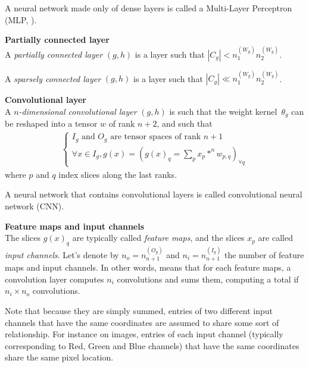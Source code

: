 A neural network made only of dense layers is called a Multi-Layer Perceptron (MLP, \cite{hornik1989multilayer}).

\begin{definition}\textbf{Partially connected layer}\\{}
A \emph{partially connected layer} $(g,h)$ is a layer such that $|C_g| < n_1^{(W_g)} n_2^{(W_g)}$.

A \emph{sparsely connected layer} $(g,h)$ is a layer such that $|C_g| \ll n_1^{(W_g)} n_2^{(W_g)}$.
\end{definition}

\begin{definition}\textbf{Convolutional layer}\\
A \emph{$n$-dimensional convolutional layer} $(g,h)$ is such that the weight kernel~$\theta_g$ can be reshaped into a tensor $w$ of rank $n+2$, and such that
\begin{gather*}
\left\{
\begin{array}{l}
  I_g \mbox{ and } O_g \mbox{ are tensor spaces of rank }n+1 \\
  \forall x \in I_g, g(x) = (g(x)_q = \sum\limits_p{x_p \ast^n w_{p,q}})_{\forall q}
\end{array}
\right.
\end{gather*}
where $p$ and $q$ index slices along the last ranks.
\label{def:convlayer}
\end{definition}

A neural network that contains convolutional layers is called convolutional neural network (CNN).

\begin{definition}\textbf{Feature maps and input channels}\\
The slices $g(x)_q$ are typically called \textit{feature maps}, and the slices $x_p$ are called \textit{input channels}. Let's denote by $n_o = n_{n+1}^{(O_g)}$ and $n_i =n_{n+1}^{(I_g)}$ the number of feature maps and input channels.
In other words,  means that for each feature maps, a convolution layer computes $n_i$ convolutions and sums them, computing a total if $n_i \times n_o$ convolutions.
\end{definition}

\begin{remark}
Note that because they are simply summed, entries of two different input channels that have the same coordinates are assumed to share some sort of relationship. For instance on images, entries of each input channel (typically corresponding to Red, Green and Blue channels) that have the same coordinates share the same pixel location.
\end{remark}

